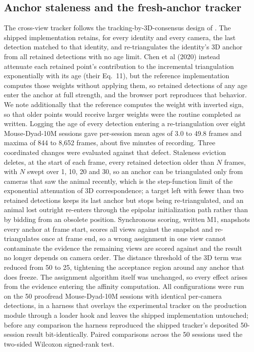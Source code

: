 \documentclass[pdflatex, sn-nature]{sn-jnl}
\theoremstyle{thmstyleone}%
\theoremstyle{thmstyletwo}%
\theoremstyle{thmstylethree}%
\begin{document}
\subsection{Anchor staleness and the fresh-anchor tracker}\label{methods-anchor}

The cross-view tracker follows the tracking-by-3D-consensus design of \citep{Chen2020}. The shipped implementation retains, for every identity and every camera, the last detection matched to that identity, and re-triangulates the identity's 3D anchor from all retained detections with no age limit. Chen et al (2020) \citep{Chen2020} instead attenuate each retained point's contribution to the incremental triangulation exponentially with its age (their Eq.~11), but the reference implementation computes those weights without applying them, so retained detections of any age enter the anchor at full strength, and the browser port reproduces that behavior. We note additionally that the reference computes the weight with inverted sign, so that older points would receive larger weights were the routine completed as written. Logging the age of every detection entering a re-triangulation over eight Mouse-Dyad-10M sessions gave per-session mean ages of 3.0 to 49.8 frames and maxima of 844 to 8,652 frames, about five minutes of recording. Three coordinated changes were evaluated against that defect. Staleness eviction deletes, at the start of each frame, every retained detection older than $N$ frames, with $N$ swept over 1, 10, 20 and 30, so an anchor can be triangulated only from cameras that saw the animal recently, which is the step-function limit of the exponential attenuation of 3D correspondence; a target left with fewer than two retained detections keeps its last anchor but stops being re-triangulated, and an animal lost outright re-enters through the epipolar initialization path rather than by bidding from an obsolete position. Synchronous scoring, written M1, snapshots every anchor at frame start, scores all views against the snapshot and re-triangulates once at frame end, so a wrong assignment in one view cannot contaminate the evidence the remaining views are scored against and the result no longer depends on camera order. The distance threshold of the 3D term was reduced from 50 to 25, tightening the acceptance region around any anchor that does freeze. The assignment algorithm itself was unchanged, so every effect arises from the evidence entering the affinity computation. All configurations were run on the 50 proofread Mouse-Dyad-10M sessions with identical per-camera detections, in a harness that overlays the experimental tracker on the production module through a loader hook and leaves the shipped implementation untouched; before any comparison the harness reproduced the shipped tracker's deposited 50-session result bit-identically. Paired comparisons across the 50 sessions used the two-sided Wilcoxon signed-rank test.
\end{document}
